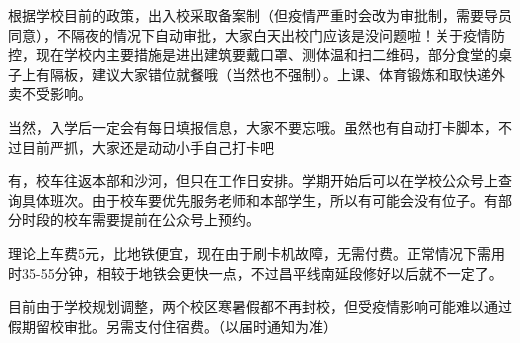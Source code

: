 
根据学校目前的政策，出入校采取备案制（但疫情严重时会改为审批制，需要导员同意），不隔夜的情况下自动审批，大家白天出校门应该是没问题啦！关于疫情防控，现在学校内主要措施是进出建筑要戴口罩、测体温和扫二维码，部分食堂的桌子上有隔板，建议大家错位就餐哦（当然也不强制）。上课、体育锻炼和取快递外卖不受影响。

当然，入学后一定会有每日填报信息，大家不要忘哦。虽然也有自动打卡脚本，不过目前严抓，大家还是动动小手自己打卡吧~


有，校车往返本部和沙河，但只在工作日安排。学期开始后可以在学校公众号上查询具体班次。由于校车要优先服务老师和本部学生，所以有可能会没有位子。有部分时段的校车需要提前在公众号上预约。

理论上车费5元，比地铁便宜，现在由于刷卡机故障，无需付费。正常情况下需用时35-55分钟，相较于地铁会更快一点，不过昌平线南延段修好以后就不一定了。


目前由于学校规划调整，两个校区寒暑假都不再封校，但受疫情影响可能难以通过假期留校审批。另需支付住宿费。（以届时通知为准）
